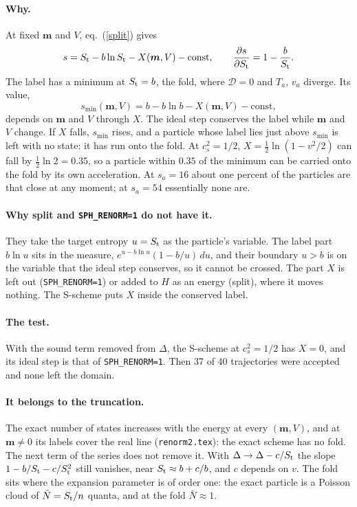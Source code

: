 \documentclass[11pt,aps,preprint,nofootinbib,superscriptaddress,tightenlines]{revtex4-2}
\def\st{\begin{equation}}
\def\stp{\end{equation}}
\def\Eq#1{eq.~(\ref{#1})}
\let\oldparagraph\paragraph
\renewcommand{\paragraph}{\par\bigskip\oldparagraph}
\begin{document}
\paragraph{Why.}  At fixed $\bm m$ and $V$, \Eq{split} gives
\st
s=S_{\rm t}-b\ln S_{\rm t}-X(\bm m,V)-\text{const},\qquad \frac{\partial s}{\partial S_{\rm t}}=1-\frac b{S_{\rm t}} .
\stp
The label has a minimum at $S_{\rm t}=b$, the fold, where $\mathcal D=0$ and $T_a$, $v_a$ diverge.  Its value,
\st
s_{\min}(\bm m,V)=b-b\ln b-X(\bm m,V)-\text{const},
\stp
depends on $\bm m$ and $V$ through $X$.  The ideal step conserves the label while $\bm m$ and $V$ change.  If $X$ falls, $s_{\min}$ rises, and a particle
whose label lies just above $s_{\min}$ is left with no state: it has run onto the fold.  At $c_s^2=1/2$, $X=\tfrac12\ln(1-v^2/2)$ can fall by $\tfrac12\ln2=0.35$,
so a particle within $0.35$ of the minimum can be carried onto the fold by its own acceleration.  At $s_a=16$ about one percent of the particles are
that close at any moment; at $s_a=54$ essentially none are.

\paragraph{Why split and \texttt{SPH\_RENORM=1} do not have it.}  They take the target entropy $u=S_{\rm t}$ as the particle's variable.  The label part
$b\ln u$ sits in the measure, $e^{u-b\ln u}(1-b/u)\,du$, and their boundary $u>b$ is on the variable that the ideal step conserves, so it cannot be
crossed.  The part $X$ is left out (\texttt{SPH\_RENORM=1}) or added to $H$ as an energy (split), where it moves nothing.  The S-scheme puts $X$ inside
the conserved label.

\paragraph{The test.}  With the sound term removed from $\Delta$, the S-scheme at $c_s^2=1/2$ has $X=0$, and its ideal step is that of
\texttt{SPH\_RENORM=1}.  Then 37 of 40 trajectories were accepted and none left the domain.

\paragraph{It belongs to the truncation.}  The exact number of states increases with the energy at every $(\bm m,V)$, and at $\bm m\ne0$ its labels cover
the real line (\nolinkurl{renorm2.tex}): the exact scheme has no fold.  The next term of the series does not remove it.  With $\Delta\to\Delta-c/S_{\rm t}$ the
slope $1-b/S_{\rm t}-c/S_{\rm t}^2$ still vanishes, near $S_{\rm t}\approx b+c/b$, and $c$ depends on $v$.  The fold sits where the expansion parameter is of
order one: the exact particle is a Poisson cloud of $\bar N=S_{\rm t}/n$ quanta, and at the fold $\bar N\approx1$.
\end{document}
